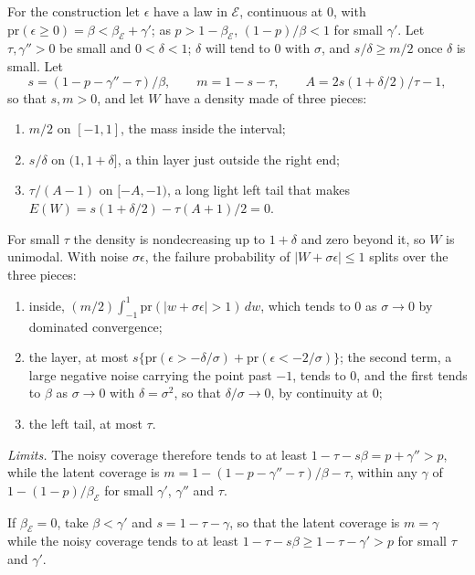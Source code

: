 \documentclass[11pt]{article}
\renewcommand{\_}{\usc\allowbreak}
\newcommand{\pr}{\mathrm{pr}}
\begin{document}
For the construction let $\epsilon$ have a law in $\mathcal E$, continuous at $0$, with $\pr(\epsilon \ge 0) = \beta < \beta_{\mathcal E} + \gamma'$; as $p > 1 - \beta_{\mathcal E}$, $(1 - p)/\beta < 1$ for small $\gamma'$. Let $\tau, \gamma'' > 0$ be small and $0 < \delta < 1$; $\delta$ will tend to $0$ with $\sigma$, and $s/\delta \ge m/2$ once $\delta$ is small. Let
\[
s = (1 - p - \gamma'' - \tau)/\beta, \qquad m = 1 - s - \tau, \qquad A = 2s(1 + \delta/2)/\tau - 1,
\]
so that $s, m > 0$, and let $W$ have a density made of three pieces:
\begin{enumerate}
\item $m/2$ on $[-1, 1]$, the mass inside the interval;
\item $s/\delta$ on $(1, 1 + \delta]$, a thin layer just outside the right end;
\item $\tau/(A - 1)$ on $[-A, -1)$, a long light left tail that makes $E(W) = s(1 + \delta/2) - \tau(A + 1)/2 = 0$.
\end{enumerate}
For small $\tau$ the density is nondecreasing up to $1 + \delta$ and zero beyond it, so $W$ is unimodal. With noise $\sigma\epsilon$, the failure probability of $|W + \sigma\epsilon| \le 1$ splits over the three pieces:
\begin{enumerate}
\item inside, $(m/2)\int_{-1}^{1} \pr(|w + \sigma\epsilon| > 1)\,dw$, which tends to $0$ as $\sigma \to 0$ by dominated convergence;
\item the layer, at most $s\{\pr(\epsilon > -\delta/\sigma) + \pr(\epsilon < -2/\sigma)\}$; the second term, a large negative noise carrying the point past $-1$, tends to $0$, and the first tends to $\beta$ as $\sigma \to 0$ with $\delta = \sigma^2$, so that $\delta/\sigma \to 0$, by continuity at $0$;
\item the left tail, at most $\tau$.
\end{enumerate}

\emph{Limits.} The noisy coverage therefore tends to at least $1 - \tau - s\beta = p + \gamma'' > p$, while the latent coverage is $m = 1 - (1 - p - \gamma'' - \tau)/\beta - \tau$, within any $\gamma$ of $1 - (1 - p)/\beta_{\mathcal E}$ for small $\gamma'$, $\gamma''$ and $\tau$.

If $\beta_{\mathcal E} = 0$, take $\beta < \gamma'$ and $s = 1 - \tau - \gamma$, so that the latent coverage is $m = \gamma$ while the noisy coverage tends to at least $1 - \tau - s\beta \ge 1 - \tau - \gamma' > p$ for small $\tau$ and $\gamma'$.
\end{document}
